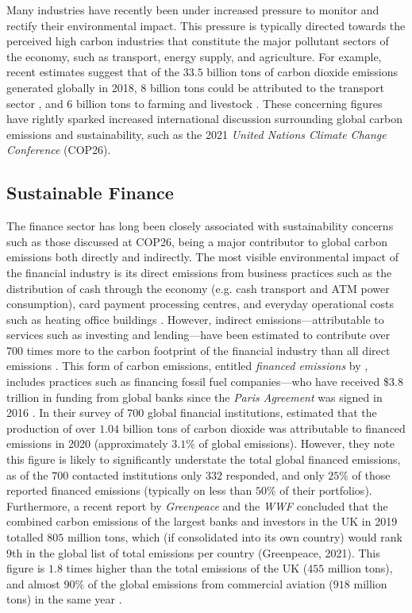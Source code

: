 \documentclass[a4paper, 11pt]{report}
\begin{document}
    Many industries have recently been under increased pressure to monitor and rectify their environmental impact. This pressure is typically directed towards the perceived high carbon industries that constitute the major pollutant sectors of the economy, such as transport, energy supply, and agriculture. For example, recent estimates suggest that of the $33.5$ billion tons of carbon dioxide emissions generated globally in 2018, $8$ billion tons could be attributed to the transport sector \citep{iea-2022}, and $6$ billion tons to farming and livestock \citep{ahmad-2022}. These concerning figures have rightly sparked increased international discussion surrounding global carbon emissions and sustainability, such as the 2021 \emph{United Nations Climate Change Conference} (COP26).


    \subsection{Sustainable Finance}

    The finance sector has long been closely associated with sustainability concerns such as those discussed at COP26, being a major contributor to global carbon emissions both directly and indirectly. The most visible environmental impact of the financial industry is its direct emissions from business practices such as the distribution of cash through the economy (e.g. cash transport and ATM power consumption), card payment processing centres, and everyday operational costs such as heating office buildings \citep{hanegraaf-2018}. However, indirect emissions---attributable to services such as investing and lending---have been estimated to contribute over 700 times more to the carbon footprint of the financial industry than all direct emissions \citep{power-2020}. This form of carbon emissions, entitled \emph{financed emissions} by \citet{power-2020}, includes practices such as financing fossil fuel companies---who have received \$3.8 trillion in funding from global banks since the \emph{Paris Agreement} was signed in 2016 \citep{rainforest-2021}. In their survey of $700$ global financial institutions, \citet{power-2020} estimated that the production of over $1.04$ billion tons of carbon dioxide was attributable to financed emissions in 2020 (approximately $3.1\%$ of global emissions). However, they note this figure is likely to significantly understate the total global financed emissions, as of the $700$ contacted institutions only $332$ responded, and only $25\%$ of those reported financed emissions (typically on less than $50\%$ of their portfolios). Furthermore, a recent report by \emph{Greenpeace} and the \emph{WWF} concluded that the combined carbon emissions of the largest banks and investors in the UK in 2019 totalled $805$ million tons, which (if consolidated into its own country) would rank 9th in the global list of total emissions per country (Greenpeace, 2021). This figure is $1.8$ times higher than the total emissions of the UK ($455$ million tons), and almost $90\%$ of the global emissions from commercial aviation ($918$ million tons) in the same year \citep{graver-2020}.
\end{document}
